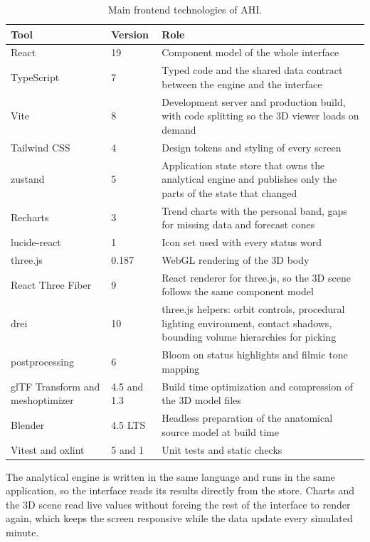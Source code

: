 \begin{table}[htbp]
\centering
\vspace{0.8em}
\caption{Main frontend technologies of AHI.}
\label{tab:frontend-stack}
\footnotesize
\begin{tabular}{p{3.6cm}p{1.6cm}p{8.8cm}}
\hline
\textbf{Tool} & \textbf{Version} & \textbf{Role} \\
\hline
React & 19 & Component model of the whole interface \\
TypeScript & 7 & Typed code and the shared data contract between the engine and the interface \\
Vite & 8 & Development server and production build, with code splitting so the 3D viewer loads on demand \\
Tailwind CSS & 4 & Design tokens and styling of every screen \\
zustand & 5 & Application state store that owns the analytical engine and publishes only the parts of the state that changed \\
Recharts & 3 & Trend charts with the personal band, gaps for missing data and forecast cones \\
lucide-react & 1 & Icon set used with every status word \\
three.js & 0.187 & WebGL rendering of the 3D body \\
React Three Fiber & 9 & React renderer for three.js, so the 3D scene follows the same component model \\
drei & 10 & three.js helpers: orbit controls, procedural lighting environment, contact shadows, bounding volume hierarchies for picking \\
postprocessing & 6 & Bloom on status highlights and filmic tone mapping \\
glTF Transform and meshoptimizer & 4.5 and 1.3 & Build time optimization and compression of the 3D model files \\
Blender & 4.5 LTS & Headless preparation of the anatomical source model at build time \\
Vitest and oxlint & 5 and 1 & Unit tests and static checks \\
\hline
\end{tabular}
\vspace{1.2em}
\end{table}

The analytical engine is written in the same language and runs in the same application, so the interface reads its results directly from the store. Charts and the 3D scene read live values without forcing the rest of the interface to render again, which keeps the screen responsive while the data update every simulated minute.

